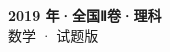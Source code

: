 \documentclass[zihao=-4, a4paper]{ctexart}
\begin{document}
\begin{center}
  {\Large\bfseries 2019 年·全国Ⅱ卷·理科}\\[4pt]
  {\large 数学 · 试题版}
\end{center}
\medskip
{}

\end{document}
